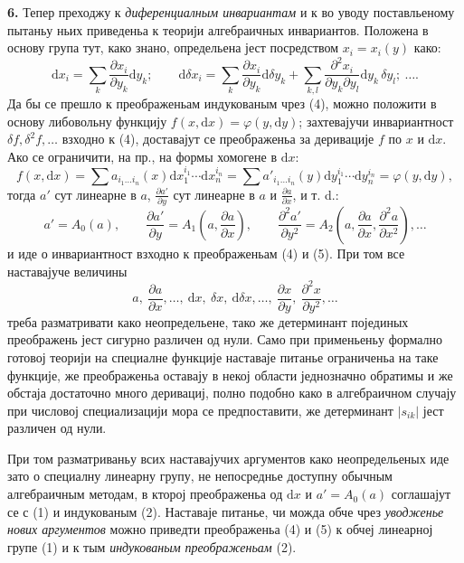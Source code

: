 ﻿\documentclass[11pt]{article}
\providecommand{\dd}{\mathrm d}
\begin{document}
\textbf{6.} Тепер преходжу к \emph{диференциалным инвариантам} и к во уводу поставльеному пытаньу ньих приведеньа к теорији алгебраичных инвариантов. Положена в основу група тут, како знано, определьена јест посредством $x_i=x_i(y)$ како:
\[
\tag{4}
\dd x_i=\sum_k \frac{\partial x_i}{\partial y_k}\dd y_k;\qquad
\dd\delta x_i=\sum_k \frac{\partial x_i}{\partial y_k}\dd\delta y_k+
\sum_{k,l}\frac{\partial^2 x_i}{\partial y_k\partial y_l}\dd y_k\,\delta y_l;\ \ldots .
\]
Да бы се прешло к преображеньам индукованым чрез (4), можно положити в основу либовольну функцију $f(x,\dd x)=\varphi(y,\dd y)$; захтевајучи инвариантност $\delta f,\delta^2f,\ldots$ взходно к (4), доставајут се преображеньа за деривације $f$ по $x$ и $\dd x$. Ако се ограничити, на пр., на формы хомогене в $\dd x$:
\[
 f(x,\dd x)=\sum a_{i_1\ldots i_n}(x)\dd x_1^{i_1}\cdots\dd x_n^{i_n}
 =\sum a'_{i_1\ldots i_n}(y)\dd y_1^{i_1}\cdots\dd y_n^{i_n}
 =\varphi(y,\dd y),
\]
тогда $a'$ сут линеарне в $a$, $\frac{\partial a'}{\partial y}$ сут линеарне в $a$ и $\frac{\partial a}{\partial x}$, и т. d.:
\[
\tag{5}
a'=A_0(a),\qquad
\frac{\partial a'}{\partial y}=A_1\!\left(a,\frac{\partial a}{\partial x}\right),\qquad
\frac{\partial^2 a'}{\partial y^2}=A_2\!\left(a,\frac{\partial a}{\partial x},\frac{\partial^2 a}{\partial x^2}\right),\ldots
\]
и иде о инвариантност взходно к преображеньам (4) и (5). При том все наставајуче величины
\[
a,\ \frac{\partial a}{\partial x},\ldots,\ \dd x,\ \delta x,\ \dd\delta x,\ldots,\ 
\frac{\partial x}{\partial y},\ \frac{\partial^2 x}{\partial y^2},\ldots
\]
треба разматривати како неопредельене, тако же детерминант појединых преображень јест сигурно различен од нули. Само при применьеньу формално готовој теорији на специалне функције наставаје питанье ограниченьа на таке функције, же преображеньа оставају в некој области једнозначно обратимы и же обстаја достаточно много деривациј, полно подобно како в алгебраичном случају при числовој специализацији мора се предпоставити, же детерминант $|s_{ik}|$ јест различен од нули.

При том разматриваньу всих наставајучих аргументов како неопредельеных иде зато о специалну линеарну групу, не непосреднье доступну обычным алгебраичным методам, в кторој преображеньа од $\dd x$ и $a'=A_0(a)$ соглашајут се с (1) и индукованым (2). Наставаје питанье, чи можда обче чрез \emph{уводженье нових аргументов} можно приведти преображеньа (4) и (5) к обчеј линеарној групе (1) и к тым \emph{индукованым преображеньам} (2).
\end{document}
